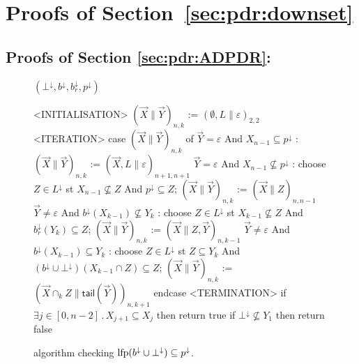 \section[Proofs of Section~\ref*{sec:pdr:downset}]{Proofs of Section~\ref{sec:pdr:downset}}
\subsection{Proofs of Section \ref{sec:pdr:ADPDR}: {\ADPDR}}

\begin{figure}[t]
	\centering
	\underline{{\APDR} $(\bot^\downarrow, b^\downarrow,b_r^{\downarrow}, p^{\downarrow})$}
	\begin{center}
		\small
		\begin{codeNT}
<INITIALISATION>
  $( \vec{X} \| \vec{Y} )_{n,k}$ := $(\emptyset,L\|\varepsilon)_{2,2}$
<ITERATION>
  case $( \vec{X} \| \vec{Y} )_{n,k}$ of
	   $\vec{Y}=\varepsilon$ And $X_{n-1} \subseteq p^{\downarrow}$     :                    %
			$( \vec{X} \| \vec{Y} )_{n,k}$ := $( \vec{X}, L \| \varepsilon )_{n+1,n+1}$
	   $\vec{Y}=\varepsilon$ And $X_{n-1} \not \subseteq p^{\downarrow}$    :                     %
			choose $Z\in L^{\downarrow}$ st  $X_{n-1} \not \subseteq Z$ And  $p^\downarrow \subseteq Z$;
			$( \vec{X} \| \vec{Y} )_{n,k}$ := $( \vec{X} \| Z )_{n,n-1}$
	   $\vec{Y} \neq \varepsilon$ And $b^\downarrow(X_{k-1}) \not \subseteq Y_k$ :                        %
			choose $Z \in L^\downarrow$ st $X_{k-1} \not \subseteq Z$ And $b_r^{\downarrow}(Y_k) \subseteq Z$;
			$(\vec{X} \| \vec{Y} )_{n,k}$ := $(\vec{X} \| Z , \vec{Y} )_{n,k-1}$
	   $\vec{Y} \neq \varepsilon$ And $b^\downarrow(X_{k-1}) \subseteq Y_k$ :                        %
			choose $Z \in L^\downarrow$ st $Z \subseteq Y_k$ And $(b^\downarrow \cup \bot^\downarrow)(X_{k-1} \cap Z) \subseteq Z$;
			$(\vec{X} \| \vec{Y} )_{n,k}$ := $(\vec{X} \cap_k Z \| \mathsf{tail}(\vec{Y}) )_{n,k+1}$
  endcase
<TERMINATION>
	if $\exists j\in [0,n-2]\,.\, X_{j+1} \subseteq X_j$ then return true		 %
	if $\bot^\downarrow \not \subseteq Y_1$ then return false							%
\end{codeNT}
	\end{center}
	\caption{{\APDR} algorithm checking $\text{lfp} (b^\downarrow \cup \bot^\downarrow) \subseteq p^\downarrow$.}
	\label{fig:app:APDRonDownset}
\end{figure}


